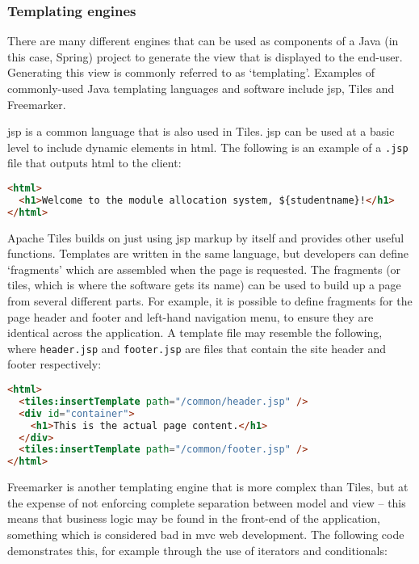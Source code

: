 \subsubsection{Templating engines}

There are many different engines that can be used as components of a Java (in
this case, Spring) project to generate the view that is displayed to the
end-user. Generating this view is commonly referred to as `templating'.
Examples of commonly-used Java templating languages and software include
\gls{jsp}, Tiles and Freemarker.


\gls{jsp} is a common language that is also used in Tiles. \gls{jsp} can be
used at a basic level to include dynamic elements in \gls{html}. The following
is an example of a \texttt{.jsp} file that outputs \gls{html} to the client:

\begin{lstlisting}[language=HTML]
<html>
  <h1>Welcome to the module allocation system, ${studentname}!</h1>
</html>
\end{lstlisting}


Apache Tiles builds on just using \gls{jsp} markup by itself and provides
other useful functions. Templates are written in the same language, but
developers can define `fragments' which are assembled when the page is
requested. The fragments (or tiles, which is where the software gets its name)
can be used to build up a page from several different parts. For example, it
is possible to define fragments for the page header and footer and left-hand
navigation menu, to ensure they are identical across the application. A
template file may resemble the following, where \texttt{header.jsp} and
\texttt{footer.jsp} are files that contain the site header and footer
respectively:

\begin{lstlisting}[language=HTML]
<html>
  <tiles:insertTemplate path="/common/header.jsp" />
  <div id="container">
    <h1>This is the actual page content.</h1>
  </div>
  <tiles:insertTemplate path="/common/footer.jsp" />
</html>
\end{lstlisting}


Freemarker is another templating engine that is more complex than Tiles, but
at the expense of not enforcing complete separation between model and view --
this means that business logic may be found in the front-end of the
application, something which is considered bad in \gls{mvc} web development.
The following code demonstrates this, for example through the use of iterators
and conditionals:

